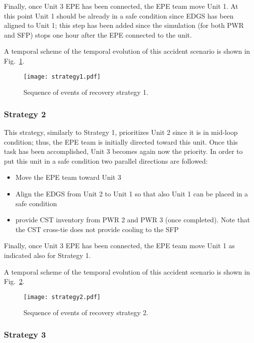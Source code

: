 Finally, once Unit 3 EPE has been connected, the EPE team move Unit 1. At this point Unit 1 should be already in a 
safe condition since EDGS has been aligned to Unit 1; this step has been added since the simulation (for 
both PWR and SFP) stops one hour after the EPE connected to the unit.

A temporal scheme of the temporal evolution of this accident scenario is shown in Fig.~\ref{fig:strategy1Scheme}.   

\begin{figure}
    \centering
    \centerline{\texttt{[image: strategy1.pdf]}}
    \caption{Sequence of events of recovery strategy 1.}
    \label{fig:strategy1Scheme}
\end{figure}

\subsubsection{Strategy 2}
\label{sec:strategy2}

This strategy, similarly to Strategy 1, prioritizes Unit 2 since it is in mid-loop condition; thus, the EPE 
team is initially directed toward this unit. 
Once this task has been accomplished, Unit 3 becomes again now the priority. In order to put this unit in a safe 
condition two parallel directions are followed:

\begin{itemize}
  \item Move the EPE team toward Unit 3 
  \item Align the EDGS from Unit 2 to Unit 1 so that also Unit 1 can be placed in a safe condition
  \item provide 
        CST inventory from PWR 2 and PWR 3 (once completed). Note that the CST cross-tie does not provide cooling 
        to the SFP
\end{itemize}

Finally, once Unit 3 EPE has been connected, the EPE team move Unit 1 as indicated also for Strategy 1.

A temporal scheme of the temporal evolution of this accident scenario is shown in Fig.~\ref{fig:strategy2Scheme}.  

\begin{figure}
    \centering
    \centerline{\texttt{[image: strategy2.pdf]}}
    \caption{Sequence of events of recovery strategy 2.}
    \label{fig:strategy2Scheme}
\end{figure}

\subsubsection{Strategy 3}
\label{sec:strategy3}


